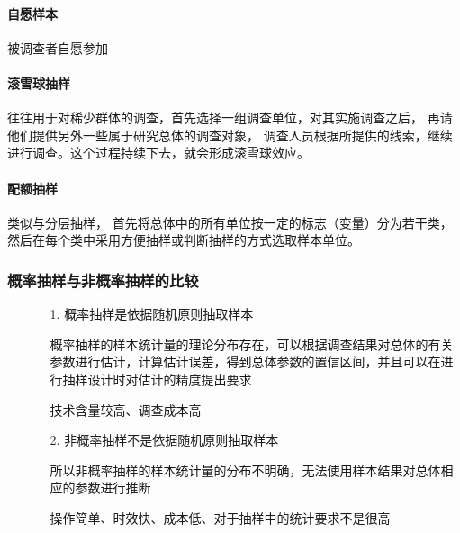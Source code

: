 \documentclass[UTF8,10pt]{book}
\begin{document}
    \paragraph{自愿样本}

    被调查者自愿参加

    \paragraph{滚雪球抽样}
    
    往往用于对稀少群体的调查，首先选择一组调查单位，对其实施调查之后，
    再请他们提供另外一些属于研究总体的调查对象，
    调查人员根据所提供的线索，继续进行调查。这个过程持续下去，就会形成滚雪球效应。

    \paragraph{配额抽样}

    类似与分层抽样，
    首先将总体中的所有单位按一定的标志（变量）分为若干类，
    然后在每个类中采用方便抽样或判断抽样的方式选取样本单位。

    \subsubsection{概率抽样与非概率抽样的比较}
        \begin{itemize}
            \item [] {
                \begin{enumerate}
                    
                    \item [1.] 概率抽样是依据随机原则抽取样本
                    
                    {\kaishu 概率抽样的样本统计量的理论分布存在，可以根据调查结果对总体的有关参数进行估计，计算估计误差，得到总体参数的置信区间，并且可以在进行抽样设计时对估计的精度提出要求}
                    
                    技术含量较高、调查成本高
                    
                    \item [2.] 非概率抽样不是依据随机原则抽取样本
                    
                    {\kaishu 所以非概率抽样的样本统计量的分布不明确，无法使用样本结果对总体相应的参数进行推断}
                    
                    操作简单、时效快、成本低、对于抽样中的统计要求不是很高
                                    
                \end{enumerate}
            }
        \end{itemize}
\end{document}
